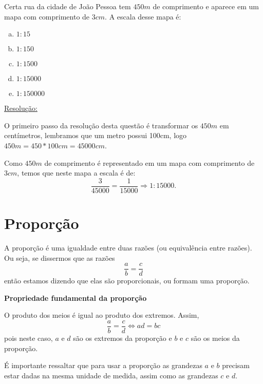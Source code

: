 \begin{exem}[FGV - 2014]
Certa rua da cidade de João Pessoa tem $450 m$ de comprimento e aparece em um mapa com comprimento de $3 cm$. A escala desse mapa é:
\begin{multicols}{5}
\begin{enumerate}[a)]
 \item $1:15$
 \item $1:150$
 \item $1:1500$
 \item $1:15000$
 \item $1:150000$
\end{enumerate}
\end{multicols}
\underline{Resolução:}

O primeiro passo da resolução desta questão é transformar os $450m$ em centímetros, lembramos que um metro possui 100cm, logo $450 m=450*100 cm= 45000 cm$.

Como $450 m$ de comprimento é representado em um mapa com comprimento de $3 cm$, temos que neste mapa a escala é de:
\[\frac{3}{45000}= \frac{1}{15000} \Rightarrow 1:15000 .\]

 \fim
\end{exem}


\section{Proporção}

A proporção é uma igualdade entre duas razões (ou equivalência entre razões). Ou seja, se dissermos que as razões
\[\frac{a}{b}= \frac{c}{d}\]
então estamos dizendo que elas são proporcionais, ou formam uma proporção.

\vskip0.3cm

\colorbox{azul}{
 \begin{minipage}{0.9\linewidth}
 \begin{center}
 \textbf{Propriedade fundamental da proporção}

   O produto dos meios é igual ao produto dos extremos. Assim,
 \[\frac{a}{b}= \frac{c}{d} \Leftrightarrow ad= bc\]
 pois neste caso, $a$ e $d$ são os extremos da proporção e $b$ e $c$ são os meios da proporção.
 \end{center}
 \end{minipage}}

 \vskip0.3cm

É importante ressaltar que para usar a proporção as grandezas $a$ e $b$ precisam estar dadas na mesma unidade de medida, assim como as grandezas $c$ e $d$.

